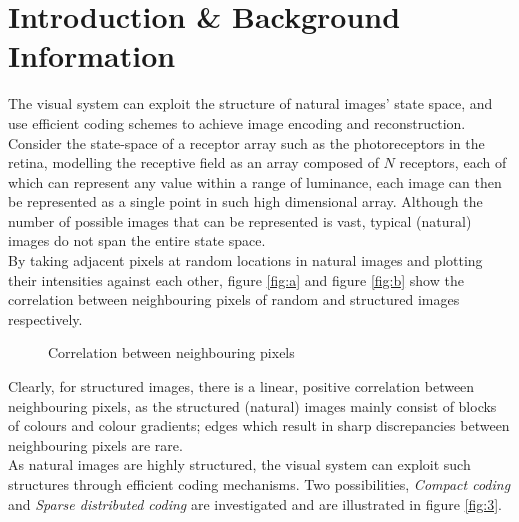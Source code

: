 \documentclass[journal]{IEEEtran}
\begin{document}
\section{Introduction \& Background Information}
The visual system can exploit the structure of natural images' state space, and use efficient coding schemes to achieve image encoding and reconstruction.\\
Consider the state-space of a receptor array such as the photoreceptors in the retina, modelling the receptive field as an array composed of $N$ receptors, each of which can represent any value within a range of luminance, each image can then be represented as a single point in such high dimensional array. Although the number of possible images that can be represented is vast, typical (natural) images do not span the entire state space. \\
By taking adjacent pixels at random locations in natural images and plotting their intensities against each other, figure \ref{fig:a} and figure \ref{fig:b} show the correlation between neighbouring pixels of random and structured images respectively. \\
\begin{figure}[htbp]
\centering     %
{}
\caption{Correlation between neighbouring pixels}
\end{figure}
Clearly, for structured images, there is a linear, positive correlation between neighbouring pixels, as the structured (natural) images mainly consist of blocks of colours and colour gradients; edges which result in sharp discrepancies between neighbouring pixels are rare. \\
As natural images are highly structured, the visual system can exploit such structures through efficient coding mechanisms. Two possibilities, \textit{Compact coding} and \textit{Sparse distributed coding} are investigated and are illustrated in figure \ref{fig:3}.
\end{document}
